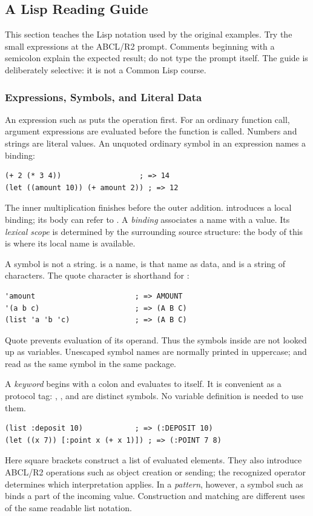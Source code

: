 \subsection{A Lisp Reading Guide}
\label{sec:lisp-reading}

This section teaches the Lisp notation used by the original examples.
Try the small expressions at the ABCL/R2 prompt. Comments beginning with
a semicolon explain the expected result; do not type the prompt itself.
The guide is deliberately selective: it is not a Common Lisp course.

\subsubsection{Expressions, Symbols, and Literal Data}

An expression such as  puts the operation first.
For an ordinary function call, argument expressions are evaluated before
the function is called. Numbers and strings are literal values.
An unquoted ordinary symbol in an expression names a binding:
\begin{lstlisting}
(+ 2 (* 3 4))                  ; => 14
(let ((amount 10)) (+ amount 2)) ; => 12
\end{lstlisting}
The inner multiplication finishes before the outer addition.
 introduces a local binding; its body can refer to .
A \emph{binding} associates a name with a value. Its \emph{lexical scope}
is determined by the surrounding source structure: the body of this
 is where its local name is available.

A symbol is not a string.  is a name,  is that
name as data, and  is a string of characters.
The quote character is shorthand for :
\begin{lstlisting}
'amount                       ; => AMOUNT
'(a b c)                      ; => (A B C)
(list 'a 'b 'c)               ; => (A B C)
\end{lstlisting}
Quote prevents evaluation of its operand. Thus the symbols inside
 are not looked up as variables.
Unescaped symbol names are normally printed in uppercase;  and
 read as the same symbol in the same package.

A \emph{keyword} begins with a colon and evaluates to itself.
It is convenient as a protocol tag: , ,
and  are distinct symbols. No variable definition is
needed to use them.
\begin{lstlisting}
(list :deposit 10)            ; => (:DEPOSIT 10)
(let ((x 7)) [:point x (+ x 1)]) ; => (:POINT 7 8)
\end{lstlisting}
Here square brackets construct a list of evaluated elements.
They also introduce ABCL/R2 operations such as object creation or sending;
the recognized operator determines which interpretation applies.
In a \emph{pattern}, however, a symbol such as  binds a part
of the incoming value. Construction and matching are different uses
of the same readable list notation.


